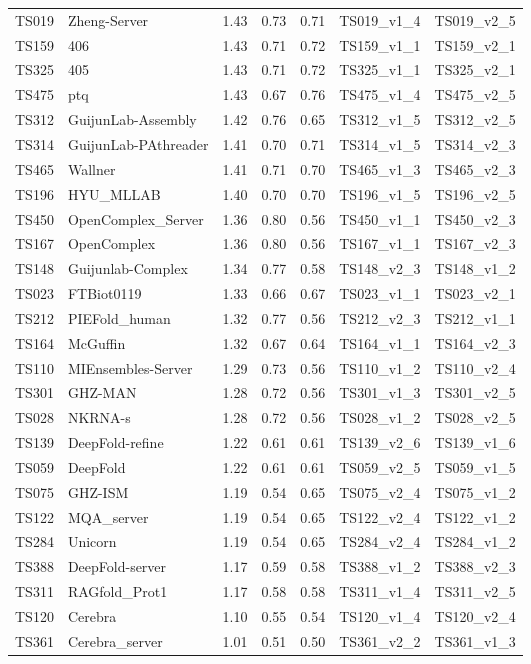 \begin{table}[ht]
{\begin{tabular}{llrrrll}
TS019 & Zheng-Server & 1.43 & 0.73 & 0.71 & TS019\_v1\_4 & TS019\_v2\_5 \\ 
TS159 & 406 & 1.43 & 0.71 & 0.72 & TS159\_v1\_1 & TS159\_v2\_1 \\ 
TS325 & 405 & 1.43 & 0.71 & 0.72 & TS325\_v1\_1 & TS325\_v2\_1 \\ 
TS475 & ptq & 1.43 & 0.67 & 0.76 & TS475\_v1\_4 & TS475\_v2\_5 \\ 
TS312 & GuijunLab-Assembly & 1.42 & 0.76 & 0.65 & TS312\_v1\_5 & TS312\_v2\_5 \\ 
TS314 & GuijunLab-PAthreader & 1.41 & 0.70 & 0.71 & TS314\_v1\_5 & TS314\_v2\_3 \\ 
TS465 & Wallner & 1.41 & 0.71 & 0.70 & TS465\_v1\_3 & TS465\_v2\_3 \\ 
TS196 & HYU\_MLLAB & 1.40 & 0.70 & 0.70 & TS196\_v1\_5 & TS196\_v2\_5 \\ 
TS450 & OpenComplex\_Server & 1.36 & 0.80 & 0.56 & TS450\_v1\_1 & TS450\_v2\_3 \\ 
TS167 & OpenComplex & 1.36 & 0.80 & 0.56 & TS167\_v1\_1 & TS167\_v2\_3 \\ 
TS148 & Guijunlab-Complex & 1.34 & 0.77 & 0.58 & TS148\_v2\_3 & TS148\_v1\_2 \\ 
TS023 & FTBiot0119 & 1.33 & 0.66 & 0.67 & TS023\_v1\_1 & TS023\_v2\_1 \\ 
TS212 & PIEFold\_human & 1.32 & 0.77 & 0.56 & TS212\_v2\_3 & TS212\_v1\_1 \\ 
TS164 & McGuffin & 1.32 & 0.67 & 0.64 & TS164\_v1\_1 & TS164\_v2\_3 \\ 
TS110 & MIEnsembles-Server & 1.29 & 0.73 & 0.56 & TS110\_v1\_2 & TS110\_v2\_4 \\ 
TS301 & GHZ-MAN & 1.28 & 0.72 & 0.56 & TS301\_v1\_3 & TS301\_v2\_5 \\ 
TS028 & NKRNA-s & 1.28 & 0.72 & 0.56 & TS028\_v1\_2 & TS028\_v2\_5 \\ 
TS139 & DeepFold-refine & 1.22 & 0.61 & 0.61 & TS139\_v2\_6 & TS139\_v1\_6 \\ 
TS059 & DeepFold & 1.22 & 0.61 & 0.61 & TS059\_v2\_5 & TS059\_v1\_5 \\ 
TS075 & GHZ-ISM & 1.19 & 0.54 & 0.65 & TS075\_v2\_4 & TS075\_v1\_2 \\ 
TS122 & MQA\_server & 1.19 & 0.54 & 0.65 & TS122\_v2\_4 & TS122\_v1\_2 \\ 
TS284 & Unicorn & 1.19 & 0.54 & 0.65 & TS284\_v2\_4 & TS284\_v1\_2 \\ 
TS388 & DeepFold-server & 1.17 & 0.59 & 0.58 & TS388\_v1\_2 & TS388\_v2\_3 \\ 
TS311 & RAGfold\_Prot1 & 1.17 & 0.58 & 0.58 & TS311\_v1\_4 & TS311\_v2\_5 \\ 
TS120 & Cerebra & 1.10 & 0.55 & 0.54 & TS120\_v1\_4 & TS120\_v2\_4 \\ 
TS361 & Cerebra\_server & 1.01 & 0.51 & 0.50 & TS361\_v2\_2 & TS361\_v1\_3 \\ 
\bottomrule
\end{tabular}%
}
\end{table}

